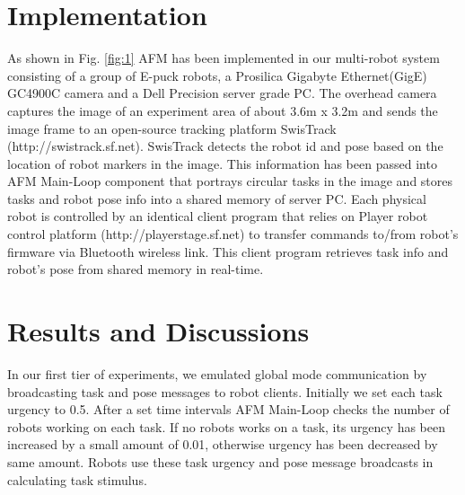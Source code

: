 \documentclass{llncs}
\begin{document}
\section{Implementation}
\label{sec:impl}
As shown in Fig. \ref{fig:1} AFM has been implemented in our multi-robot system consisting of a group of E-puck robots, a Prosilica Gigabyte Ethernet(GigE) GC4900C camera and a Dell Precision server grade PC. The overhead camera captures the image of an experiment area of about 3.6m x 3.2m and sends the image frame to an open-source tracking platform SwisTrack (http://swistrack.sf.net). SwisTrack detects the robot id and pose based on the location of robot markers in the image. This information has been passed into AFM Main-Loop component that portrays circular tasks in the image and stores tasks and robot pose info into a shared memory of server PC. Each physical robot is controlled by an identical client program that relies on Player robot control platform (http://playerstage.sf.net) to transfer commands to/from robot's firmware via Bluetooth wireless link. This client program retrieves task info and robot's pose from shared memory in real-time.


\section{Results and Discussions}
\label{sec:results}
In our first tier of experiments, we emulated global mode communication by broadcasting task and pose messages to robot clients. Initially we set each task urgency to 0.5. After a set time intervals AFM Main-Loop checks the number of robots working on each task. If no robots works on a task, its urgency has been increased by a small amount of 0.01, otherwise urgency has been decreased by same amount. Robots use these task urgency and pose message broadcasts in calculating task stimulus.
\end{document}
